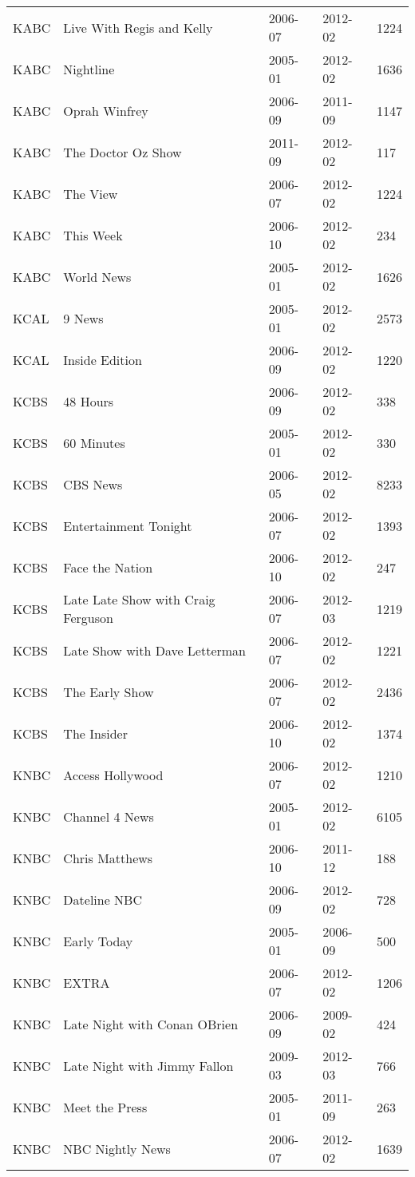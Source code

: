 \begin{longtable}{lllll}
KABC & Live With Regis and Kelly & 2006-07 & 2012-02 & 1224\\
\addlinespace
KABC & Nightline & 2005-01 & 2012-02 & 1636\\
KABC & Oprah Winfrey & 2006-09 & 2011-09 & 1147\\
KABC & The Doctor Oz Show & 2011-09 & 2012-02 & 117\\
KABC & The View & 2006-07 & 2012-02 & 1224\\
KABC & This Week & 2006-10 & 2012-02 & 234\\
\addlinespace
KABC & World News & 2005-01 & 2012-02 & 1626\\
KCAL & 9 News & 2005-01 & 2012-02 & 2573\\
KCAL & Inside Edition & 2006-09 & 2012-02 & 1220\\
KCBS & 48 Hours & 2006-09 & 2012-02 & 338\\
KCBS & 60 Minutes & 2005-01 & 2012-02 & 330\\
\addlinespace
KCBS & CBS News & 2006-05 & 2012-02 & 8233\\
KCBS & Entertainment Tonight & 2006-07 & 2012-02 & 1393\\
KCBS & Face the Nation & 2006-10 & 2012-02 & 247\\
KCBS & Late Late Show with Craig Ferguson & 2006-07 & 2012-03 & 1219\\
KCBS & Late Show with Dave Letterman & 2006-07 & 2012-02 & 1221\\
\addlinespace
KCBS & The Early Show & 2006-07 & 2012-02 & 2436\\
KCBS & The Insider & 2006-10 & 2012-02 & 1374\\
KNBC & Access Hollywood & 2006-07 & 2012-02 & 1210\\
KNBC & Channel 4 News & 2005-01 & 2012-02 & 6105\\
KNBC & Chris Matthews & 2006-10 & 2011-12 & 188\\
\addlinespace
KNBC & Dateline NBC & 2006-09 & 2012-02 & 728\\
KNBC & Early Today & 2005-01 & 2006-09 & 500\\
KNBC & EXTRA & 2006-07 & 2012-02 & 1206\\
KNBC & Late Night with Conan OBrien & 2006-09 & 2009-02 & 424\\
KNBC & Late Night with Jimmy Fallon & 2009-03 & 2012-03 & 766\\
\addlinespace
KNBC & Meet the Press & 2005-01 & 2011-09 & 263\\
KNBC & NBC Nightly News & 2006-07 & 2012-02 & 1639\\

\end{longtable}
